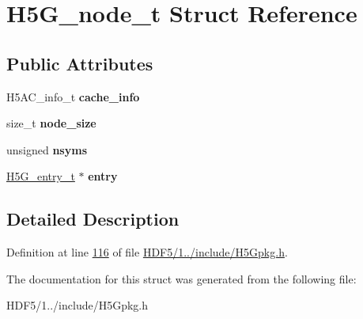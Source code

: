 \hypertarget{struct_h5_g__node__t}{}\section{H5\+G\+\_\+node\+\_\+t Struct Reference}
\label{struct_h5_g__node__t}
\subsection*{Public Attributes}
\begin{DoxyCompactItemize}
\item 
\mbox{\label{struct_h5_g__node__t_a0309d3cedd5342e209e40f6e76ef5d9e}} 
H5\+A\+C\+\_\+info\+\_\+t {\bfseries cache\+\_\+info}
\item 
\mbox{\label{struct_h5_g__node__t_af2ac6a20893a3b7d2a712b352238940e}} 
size\+\_\+t {\bfseries node\+\_\+size}
\item 
\mbox{\label{struct_h5_g__node__t_a271d4238363aabb2b6577367f5af2af2}} 
unsigned {\bfseries nsyms}
\item 
\mbox{\label{struct_h5_g__node__t_a0c024458a1e2ee4534b3d3fbe7ccb620}} 
\hyperlink{struct_h5_g__entry__t}{H5\+G\+\_\+entry\+\_\+t} $\ast$ {\bfseries entry}
\end{DoxyCompactItemize}


\subsection{Detailed Description}


Definition at line \hyperlink{_h_d_f5_21_810_81_2include_2_h5_gpkg_8h_source_l00116}{116} of file \hyperlink{_h_d_f5_21_810_81_2include_2_h5_gpkg_8h_source}{H\+D\+F5/1../include/\+H5\+Gpkg.\+h}.



The documentation for this struct was generated from the following file\+:\begin{DoxyCompactItemize}
\item 
H\+D\+F5/1../include/\+H5\+Gpkg.\+h\end{DoxyCompactItemize}
